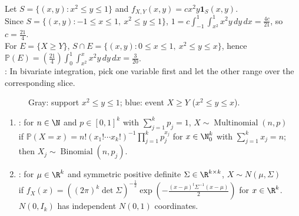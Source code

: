 \begin{example} \label{ex:bivariate-density-nonrectangular-region} \\
Let $S=\{(x,y):x^2\leq y\leq1\}$ and $f_{X,Y}(x,y)=cx^2y\mathbf{1}_S(x,y)$.\\
Since $S=\{(x,y):-1\leq x\leq1,\ x^2\leq y\leq1\}$, $1=c\int_{-1}^{1}\int_{x^2}^{1}x^2y\,dy\,dx=\frac{4c}{21}$, so $c=\frac{21}{4}$.\\
For $E=\{X\geq Y\}$, $S\cap E=\{(x,y):0\leq x\leq1,\ x^2\leq y\leq x\}$, hence $\mathbb{P}(E)=(\frac{21}{4})\int_0^1\int_{x^2}^{x}x^2y\,dy\,dx=\frac{3}{20}$.\\
: In bivariate integration, pick one variable first and let the other range over the corresponding slice.
\end{example}

\begin{figure}[H]
  \centering
  
  \caption{\textcolor{gray!70!black}{Gray}: support $x^2\leq y\leq1$; \textcolor{blue!70!black}{blue}: event $X\geq Y$ ($x^2\leq y\leq x$).}
  \label{fig:parabolic-bivariate-region}
\end{figure}

\begin{definition} \label{def:multinomial-and-multivariate-normal} 
\begin{enumerate}[label=(\roman*)]
\setlength{\itemsep}{0pt}
\item {}: for $n\in\N$ and $p\in[0,1]^k$ with $\sum\limits_{j=1}^{k}p_j=1$, $X\sim\operatorname{Multinomial}(n,p)$\\
if $\mathbb{P}(X=x)=n!(x_1!\cdots x_k!)^{-1}\prod\limits_{j=1}^{k}p_j^{x_j}$ for $x\in\N_0^k$ with $\sum\limits_{j=1}^{k}x_j=n$; then $X_j\sim\operatorname{Binomial}(n,p_j)$.
\item {}: for $\mu\in\R^k$ and symmetric positive definite $\Sigma\in\R^{k\times k}$, $X\sim N(\mu,\Sigma)$\\
if $f_X(x)=((2\pi)^k\det\Sigma)^{-\frac{1}{2}}\exp(-\frac{(x-\mu)^t\Sigma^{-1}(x-\mu)}{2})$ for $x\in\R^k$.\\
$N(0,I_k)$ has independent $N(0,1)$ coordinates.
\end{enumerate}
\end{definition}

